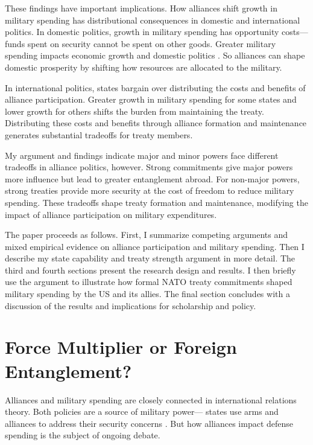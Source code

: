 \documentclass[12pt]{article}
\begin{document}
These findings have important implications. 
How alliances shift growth in military spending has distributional consequences in domestic and international politics.
In domestic politics, growth in military spending has opportunity costs--- funds spent on security cannot be spent on other goods. 
Greater military spending impacts economic growth \citep{ShinWard1999, AlptekinLevine2012} and domestic politics \citep{Narizny2003, WhittenWilliams2011, Williams2015}.
So alliances can shape domestic prosperity by shifting how resources are allocated to the military. 


In international politics, states bargain over distributing the costs and benefits of alliance participation.
Greater growth in military spending for some states and lower growth for others shifts the burden from maintaining the treaty. 
Distributing these costs and benefits through alliance formation and maintenance generates substantial tradeoffs for treaty members.  


My argument and findings indicate major and minor powers face different tradeoffs in alliance politics, however.
Strong commitments give major powers more influence but lead to greater entanglement abroad.
For non-major powers, strong treaties provide more security at the cost of freedom to reduce military spending. 
These tradeoffs shape treaty formation and maintenance, modifying the impact of alliance participation on military expenditures. 


The paper proceeds as follows. 
First, I summarize competing arguments and mixed empirical evidence on alliance participation and military spending. 
Then I describe my state capability and treaty strength argument in more detail. 
The third and fourth sections present the research design and results. 
I then briefly use the argument to illustrate how formal NATO treaty commitments shaped military spending by the US and its allies. 
The final section concludes with a discussion of the results and implications for scholarship and policy.  


\section{Force Multiplier or Foreign Entanglement?}


Alliances and military spending are closely connected in international relations theory. 
Both policies are a source of military power--- states use arms and alliances to address their security concerns \citep{Morrow1993}. 
But how alliances impact defense spending is the subject of ongoing debate. 
\end{document}
